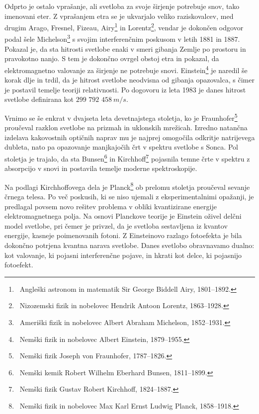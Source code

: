 Odprto je ostalo vprašanje, ali svetloba za svoje širjenje
potrebuje snov, tako imenovani eter. Z vprašanjem etra se je 
ukvarjalo veliko raziskovalcev, med drugim Arago, Fresnel, Fizeau, Airy\footnote{~Angleški astronom in matematik Sir 
George Biddell Airy, 1801--1892.} in Lorentz\footnote{~Nizozemski fizik in 
nobelovec Hendrik Antoon Lorentz, 1863--1928.},
vendar je dokončen odgovor podal šele Michelson\footnote{~Ameriški fizik in nobelovec Albert
Abraham Michelson, 1852--1931.} s svojim
interferenčnim poskusom v letih 1881 in 1887. Pokazal je, da
sta hitrosti svetlobe enaki v smeri gibanja Zemlje po prostoru in 
pravokotno nanjo. S tem je dokončno ovrgel obstoj etra in pokazal, 
da elektromagnetno valovanje za širjenje ne potrebuje snovi. 
Einstein\footnote{~Nemški fizik in nobelovec Albert Einstein, 1879--1955.} 
je naredil še korak dlje in trdil, da je hitrost
svetlobe neodvisna od gibanja opazovalca, s čimer je postavil temelje 
teoriji relativnosti. Po dogovoru iz leta 1983 je danes 
hitrost svetlobe  definirana kot $299\,\,792\,\,458~\si{m/s}$.

Vrnimo se še enkrat v dvajseta leta devetnajstega stoletja, ko je 
Fraunhofer\footnote{~Nemški fizik Joseph von Fraunhofer, 1787--1826.}
proučeval razklon svetlobe na prizmah in uklonskih mrežicah. Izredno
natančna izdelava kakovostnih optičnih naprav mu je najprej omogočila odkritje 
natrijevega dubleta, nato pa opazovanje manjkajočih črt v spektru
svetlobe s Sonca. Pol stoletja je trajalo, da
sta Bunsen\footnote{~Nemški kemik Robert Wilhelm Eberhard Bunsen, 1811--1899.}
in Kirchhoff\footnote{~Nemški fizik Gustav Robert Kirchhoff, 1824--1887.}
pojasnila temne črte v spektru z absorpcijo v snovi in postavila temelje
moderne spektroskopije.

Na podlagi Kirchhoffovega dela je Planck\footnote{~Nemški fizik in nobelovec
Max Karl Ernst Ludwig Planck, 1858--1918.} ob prelomu stoletja
proučeval sevanje črnega telesa. Po več poskusih, ki se niso
ujemali z eksperimentalnimi opažanji, je predlagal povsem novo rešitev problema
v obliki kvantizirane energije elektromagnetnega polja. Na osnovi
Planckove teorije je Einstein oživel delčni model svetlobe, pri čemer
je privzel, da je svetloba sestavljena iz kvantov energije, kasneje 
poimenovanih fotoni. Z Einsteinovo razlago fotoefekta je bila dokončno
potrjena kvantna narava svetlobe. Danes svetlobo obravnavamo
dualno: kot valovanje, ki pojasni interferenčne 
pojave, in hkrati kot delce, ki pojasnijo fotoefekt.
